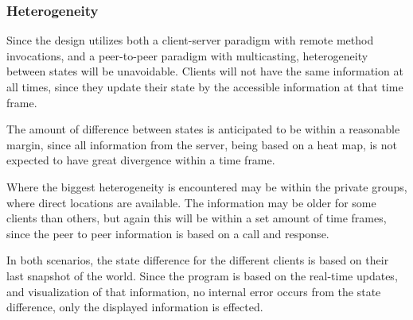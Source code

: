 


\subsubsection{Heterogeneity}

Since the design utilizes both a client-server paradigm with remote method invocations, and a peer-to-peer paradigm with  multicasting, heterogeneity between states will be unavoidable. Clients will not have the same information at all times, since they update their state by the accessible information at that time frame. 

The amount of difference between states is anticipated to be within a reasonable margin, since all information from the server, being based on a heat map, is not expected to have great divergence within a time frame. 

Where the biggest heterogeneity is encountered may be within the private groups, where direct locations are available. The information may be older for some clients than others, but again this will be within a set amount of time frames, since the peer to peer information is based on a call and response. 

In both scenarios, the state difference for the different clients is based on their last snapshot of the world. Since the program is based on the real-time updates, and visualization of that information, no internal error occurs from the state difference, only the displayed information is effected.






